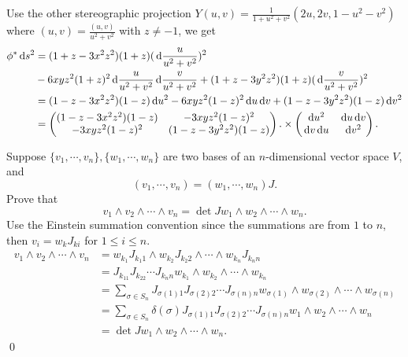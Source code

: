 \begin{enumerate}
Use the other stereographic projection $Y(u,v)=\frac{1}{1+u^2+v^2}(2u,2v,1-u^2-v^2)$ where $(u,v)=\frac{(u,v)}{u^2+v^2}$ with $z\neq -1$, we get \begin{align*}
	\phi^* \,\mathrm{d} s^2 &= (1+z-3x^2z^2)(1+z)(\,\mathrm{d} \frac{u}{u^2+v^2})^2 \\
	&-6xyz^2(1+z)^2\,\mathrm{d} \frac{u}{u^2+v^2}\,\mathrm{d} \frac{v}{u^2+v^2} +(1+z-3y^2z^2)(1+z)(\,\mathrm{d} \frac{v}{u^2+v^2})^2 \\
	&= (1-z-3x^2z^2)(1-z)\,\mathrm{d} u^2 -6xyz^2(1-z)^2\,\mathrm{d} u\,\mathrm{d} v +(1-z-3y^2z^2)(1-z)\,\mathrm{d} v^2 \\
	&= \begin{pmatrix}
	(1-z-3x^2z^2)(1-z) & -3xyz^2(1-z)^2 \\
	- 3xyz^2(1-z)^2 & (1-z-3y^2z^2)(1-z)
	\end{pmatrix}.\times \begin{pmatrix}
		\,\mathrm{d} u^2 & \,\mathrm{d} u \,\mathrm{d} v \\
		\,\mathrm{d} v\,\mathrm{d} u & \,\mathrm{d} v^2
	\end{pmatrix}.
\end{align*}

\newpage
\prob 
Suppose $\{v_1,\cdots,v_n\},\{w_1,\cdots,w_n\}$ are two bases of an $n$-dimensional vector space $V$, and $$
(v_1,\cdots,v_n)=(w_1,\cdots,w_n)J.$$
Prove that $$
v_1\wedge v_2 \wedge \cdots \wedge v_n = \det{J} w_1\wedge w_2 \wedge \cdots \wedge w_n.$$
\soln
Use the Einstein summation convention since the summations are from $1$ to $n$, then $v_i= w_k J_{ki}$ for $1\leq i \leq n$. 
\begin{align*}
	v_1\wedge v_2 \wedge \cdots \wedge v_n &= w_{k_1}J_{k_1 1}\wedge w_{k_2}J_{k_2 2} \wedge \cdots \wedge w_{k_n}J_{k_n n} \\
	&= J_{k_11}J_{k_22}\cdots J_{k_nn} w_{k_1}\wedge w_{k_2} \wedge \cdots \wedge w_{k_n} \\
	&= \sum_{\sigma\in S_n} J_{\sigma(1)1}J_{\sigma(2)2}\cdots J_{\sigma(n)n} w_{\sigma(1)}\wedge w_{\sigma(2)} \wedge \cdots \wedge w_{\sigma(n)} \\
	&= \sum_{\sigma\in S_n} \delta(\sigma) J_{\sigma(1)1}J_{\sigma(2)2}\cdots J_{\sigma(n)n} w_1\wedge w_2 \wedge \cdots \wedge w_n \\
	&= \det{J} w_1\wedge w_2 \wedge \cdots \wedge w_n.
\end{align*}
\qed

\end{enumerate}
